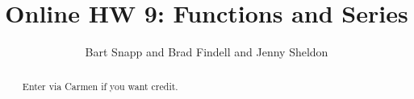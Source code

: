 \documentclass[handout,space,nooutcomes]{xourse}
\title{Online HW 9: Functions and Series}
\author{Bart Snapp and Brad Findell and Jenny Sheldon}
\begin{document}
\begin{abstract}
Enter via Carmen if you want credit.   
\end{abstract}
\maketitle


\end{document}
